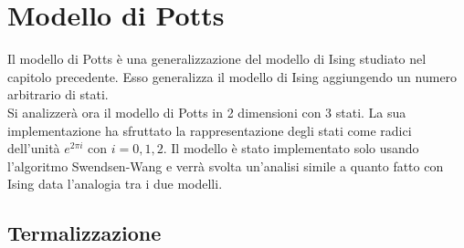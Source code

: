 \newpage
\chapter{Modello di Potts}
Il modello di Potts è una generalizzazione del modello di Ising studiato nel capitolo precedente.
Esso generalizza il modello di Ising aggiungendo un numero arbitrario di stati.\\
 Si analizzerà ora il modello di Potts in 2 dimensioni con 3 stati. La sua implementazione ha sfruttato la rappresentazione degli stati come radici dell'unità $e^{2 \pi i}$ con $i=0,1,2$.
Il modello è stato implementato solo usando l'algoritmo Swendsen-Wang e verrà svolta un'analisi simile a quanto fatto con Ising data l'analogia tra i due modelli.


\section{Termalizzazione}

